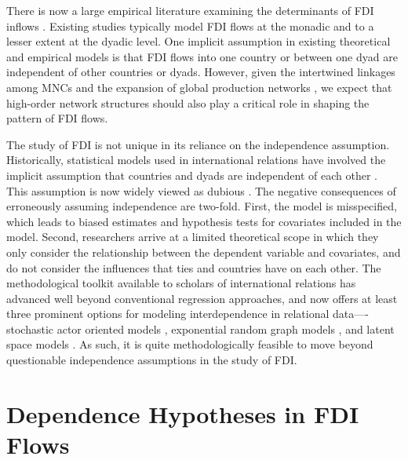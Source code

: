 \documentclass{article}
\begin{document}
There is now a large empirical literature examining the determinants of FDI inflows \citep[e.g.,][]{Noorbakhsh_et_al:2001,Yeaple:2003,Jensen:2003,Li_Resnick:2003,Buthe_Milner:2008,Li_Vashchilko:2010,Kerner:2009}. Existing studies typically model FDI flows at the monadic and to a lesser extent at the dyadic level. One implicit assumption in existing theoretical and empirical models is that FDI flows into one country or between one dyad are independent of other countries or dyads. However, given the intertwined linkages among MNCs and the expansion of global production networks \citep{UNCTAD:2013}, we expect that high-order network structures should also play a critical role in shaping the pattern of FDI flows. 

The study of FDI is not unique in its reliance on the independence assumption. Historically, statistical models used in international relations have involved the implicit assumption that countries and dyads are independent of each other \citep{diehl2016conditional,ward2007persistent}. This assumption is now widely viewed as dubious \citep[see, e.g., ][]{ward2007persistent, chu2010homogenization,cranmer2016critique,dorff2013networks,lee2013network,howell2013geography,kinne2016agreeing}. The negative consequences of erroneously assuming independence are two-fold. First, the model is misspecified, which leads to biased estimates and hypothesis tests for covariates included in the model. Second, researchers arrive at a limited theoretical scope in which they only consider the relationship between the dependent variable and covariates, and do not consider the influences that ties and countries have on each other. The methodological toolkit available to scholars of international relations has advanced well beyond conventional regression approaches, and now offers at least three prominent options for modeling interdependence in relational data----stochastic actor oriented models \citep[e.g., ][]{camber2010geometry,kinne2016agreeing,kinne2013network,kinne2014dependent,warren2016modeling}, exponential random graph models \citep[e.g.,][]{cranmer2012complex,cranmer2012toward,raeymaeckers2016influence}, and latent space models \citep[e.g., ][]{ward2007disputes,ward2013gravity,metternich2013antigovernment}. As such, it is quite methodologically feasible to move beyond questionable independence assumptions in the study of FDI.


\section{Dependence Hypotheses in FDI Flows}
\end{document}

